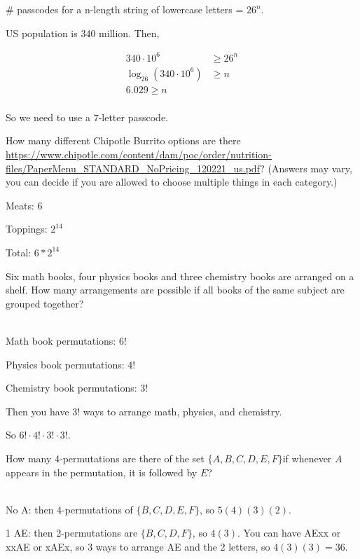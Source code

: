 \documentclass[12 pt]{exam}
\begin{document}
\begin{questions}
\begin{solution}
\# passcodes for a n-length string of lowercase letters = $26^n$.

US population is 340 million. Then,

\begin{align*}
    340 \cdot 10^6 &\ge 26^n\\
    \log_{26}(340 \cdot 10^6) &\ge n\\
    6.029 \ge n\\
\end{align*}

So we need to use a $7$-letter passcode.
\end{solution}


\question  How many different Chipotle Burrito options are there \url{https://www.chipotle.com/content/dam/poc/order/nutrition-files/PaperMenu_STANDARD_NoPricing_120221_us.pdf}? (Answers may vary, you can decide if you are allowed to choose multiple things in each category.)

\begin{solution}
Meats: 6

Toppings: $2^{14}$

Total: $6 * 2^{14}$
\end{solution}



\question Six math books, four physics books and three chemistry books are arranged on
a shelf. How many arrangements are possible if all books of the same subject
are grouped together?

\begin{solution}\\
Math book permutations: $6!$

Physics book permutations: $4!$

Chemistry book permutations: $3!$

Then you have $3!$ ways to arrange math, physics, and chemistry.

So $6! \cdot 4! \cdot 3! \cdot 3!$.
\end{solution}


\question How many 4-permutations are there of the set $\{A,B,C,D,E,F\}$if whenever $A$
appears in the permutation, it is followed by $E$?

\begin{solution}\\
No A: then 4-permutations of $\{B, C, D, E, F\}$, so $5(4)(3)(2)$.

1 AE: then 2-permutations are $\{B, C, D, F\}$, so $4(3)$.
You can have AExx or xxAE or xAEx, so 3 ways to arrange AE and the 2 letters, so $4(3)(3) = 36$.


\end{solution}
\end{questions}
\end{document}
